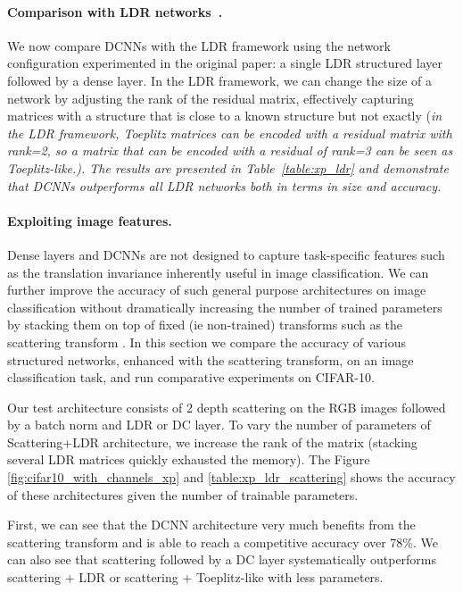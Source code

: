 \paragraph{Comparison with LDR networks~\cite{Thomas_NIPS2018_8119}.}
We now compare DCNNs with the LDR framework using the network configuration experimented in the original paper: a single LDR structured layer followed by a dense layer.
In the LDR framework, we can change the size of a network by adjusting the rank of the residual matrix, effectively capturing matrices with a structure that is close to a known structure but not exactly (\em in the LDR framework, Toeplitz matrices can be encoded with a residual matrix with rank=2, so a matrix that can be encoded with a residual of rank=3 can be seen as Toeplitz-like.).
The results are presented in Table~\ref{table:xp_ldr} and demonstrate that DCNNs outperforms all LDR networks both in terms in size and accuracy.

\paragraph{Exploiting image features.}
Dense layers and DCNNs are not designed to capture task-specific features such as the translation invariance inherently useful in image classification.
We can further improve the accuracy of such general purpose architectures on image classification without dramatically increasing the number of trained parameters by stacking them on top of fixed (ie non-trained) transforms such as the scattering transform \cite{mallat2010recursive}.
In this section we compare the accuracy of various structured networks, enhanced with the scattering transform, on an image classification task, and run comparative experiments on CIFAR-10. 

Our test architecture consists of 2 depth scattering on the RGB images followed by a batch norm and LDR or DC layer.
To vary the number of parameters of Scattering+LDR architecture, we increase the rank of the matrix (stacking several LDR matrices quickly exhausted the memory).
The Figure \ref{fig:cifar10_with_channels_xp} and \ref{table:xp_ldr_scattering} shows the accuracy of these architectures given the number of trainable parameters.

First, we can see that the DCNN architecture very much benefits from the scattering transform and is able to reach a competitive accuracy over 78\%.
We can also see that scattering followed by a DC layer systematically outperforms scattering + LDR or scattering + Toeplitz-like with less parameters. 


